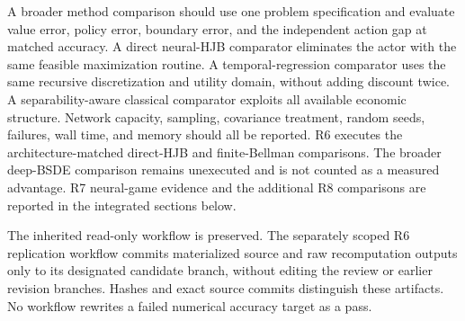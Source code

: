 \documentclass[ecta,draft]{econsocart}
\begin{document}
A broader method comparison should use one problem specification and evaluate value error, policy error, boundary error, and the independent action gap at matched accuracy. A direct neural-HJB comparator eliminates the actor with the same feasible maximization routine. A temporal-regression comparator uses the same recursive discretization and utility domain, without adding discount twice. A separability-aware classical comparator exploits all available economic structure. Network capacity, sampling, covariance treatment, random seeds, failures, wall time, and memory should all be reported. R6 executes the architecture-matched direct-HJB and finite-Bellman comparisons. The broader deep-BSDE comparison remains unexecuted and is not counted as a measured advantage. R7 neural-game evidence and the additional R8 comparisons are reported in the integrated sections below.

The inherited read-only workflow is preserved. The separately scoped R6 replication workflow commits materialized source and raw recomputation outputs only to its designated candidate branch, without editing the review or earlier revision branches. Hashes and exact source commits distinguish these artifacts. No workflow rewrites a failed numerical accuracy target as a pass.




\end{document}
